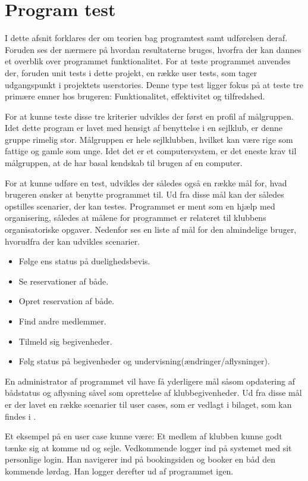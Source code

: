 \chapter{Program test}
I dette afsnit forklares der om teorien bag programtest samt udførelsen deraf. Foruden ses der nærmere på hvordan resultaterne bruges, hvorfra der kan dannes et overblik over programmet funktionalitet. For at teste programmet anvendes der, foruden unit tests i dette projekt, en række user tests, som tager udgangspunkt i projektets userstories. Denne type test ligger fokus på at teste tre primære emner hos brugeren: Funktionalitet, effektivitet og tilfredshed. 

For at kunne teste disse tre kriterier udvikles der først en profil af målgruppen. Idet dette program er lavet med hensigt af benyttelse i en sejlklub, er denne gruppe rimelig stor. Målgruppen er hele sejlklubben, hvilket kan være rige som fattige og gamle som unge. Idet det er et computersystem, er det eneste krav til målgruppen, at de har basal kendskab til brugen af en computer.

For at kunne udføre en test, udvikles der således også en række mål for, hvad brugeren ønsker at benytte programmet til. Ud fra disse mål kan der således opstilles scenarier, der kan testes. Programmet er ment som en hjælp med organisering, således at målene for programmet er relateret til klubbens organisatoriske opgaver. Nedenfor ses en liste af mål for den almindelige bruger, hvorudfra der kan udvikles scenarier.

\begin{itemize}
  \item Følge ens status på duelighedsbevis.
  \item Se reservationer af både.
  \item Opret reservation af både.
  \item Find andre medlemmer.
  \item Tilmeld sig begivenheder.
  \item Følg status på begivenheder og undervisning(ændringer/aflysninger).
\end{itemize}

En administrator af programmet vil have få yderligere mål såsom opdatering af bådstatus og aflysning såvel som oprettelse af klubbegivenheder. Ud fra disse mål er der lavet en række scenarier til user cases, som er vedlagt i bilaget, som kan findes i . 

Et eksempel på en user case kunne være: Et medlem af klubben kunne godt tænke sig at komme ud og sejle. Vedkommende logger ind på systemet med sit personlige login. Han navigerer ind på bookingsiden og booker en båd den kommende lørdag. Han logger derefter ud af programmet igen.

